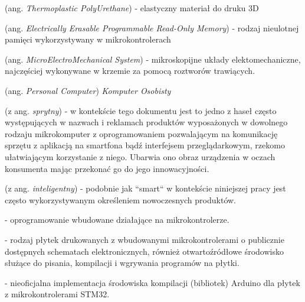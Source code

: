 \begin{description}[labelwidth=*]
  \item [TPU] (ang. \emph{Thermoplastic PolyUrethane}) - elastyczny materiał do druku 3D
  
  \item [EEPROM] (ang. \emph{Electrically Erasable Programmable Read-Only Memory}) - rodzaj nieulotnej pamięci wykorzystywany w mikrokontrolerach
  
  \item [MEMS] (ang. \emph{MicroElectroMechanical System}) - mikroskopijne układy elektomechaniczne, najczęściej wykonywane w krzemie za pomocą roztworów trawiących.
  
  \item [PC] (ang. \emph{Personal Computer}) \emph{Komputer Osobisty}
  
  \item [Smart] (z ang. \emph{sprytny})  - w kontekście tego dokumentu jest to jedno z haseł często występujących w nazwach i reklamach produktów wyposażonych w dowolnego rodzaju mikrokomputer z oprogramowaniem pozwalającym na komunikację sprzętu z aplikacją na smartfona bądź interfejsem przeglądarkowym, rzekomo ułatwiającym korzystanie z niego. Ubarwia ono obraz urządzenia w oczach konsumenta mając przekonać go do jego innowacyjności. 
  
  \item [Intelligent] (z ang. \emph{inteligentny})  - podobnie jak ``smart`` w kontekście niniejszej pracy jest często wykorzystywanym określeniem nowoczesnych produktów.
  
  \item [Firmware] - oprogramowanie wbudowane działające na mikrokontrolerze.
  
  \item [Arduino] - rodzaj płytek drukowanych\cite{arduino-boards} z wbudowanymi mikrokontrolerami o publicznie dostępnych schematach elektronicznych, również otwartoźródłowe środowisko służące do pisania, kompilacji i wgrywania programów na płytki.
  
  \item [STM32duino] - nieoficjalna implementacja środowiska kompilacji (bibliotek) Arduino dla płytek z mikrokontrolerami STM32.
  
\end{description}
